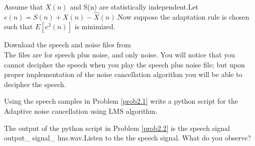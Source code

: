 \documentclass[journal,12pt,twocolumn]{IEEEtran}
\begin{document}
Assume that $X(n)$ and S(n) are statistically independent.Let $e(n)=S(n)+X(n)-\hat X(n)$.Now suppose the adaptation rule is chosen such that $E[e^2(n)]$ is minimized.
\begin{problem}
Download the speech and noise files from\\

The files are for speech plus noise, and only noise. You will notice that you cannot decipher the speech when you play the speech plus noise file; but upon proper implementation of the noise cancellation algorithm you will be able to decipher the speech.\\
\label{prob3.1}
\end{problem}
\begin{problem}
Using the speech samples in Problem \ref{prob2.1} write a python script for the Adaptive noise cancellation using LMS algorithm.\\ \label{prob3.2}
\end{problem}
\solution
	  
	  
\begin{problem}
The output of the python script in Problem \ref{prob2.2} is the speech signal output\_ signal\_ lms.wav.Listen to the the speech signal. What do you observe?	 
\end{problem} 
\end{document}
